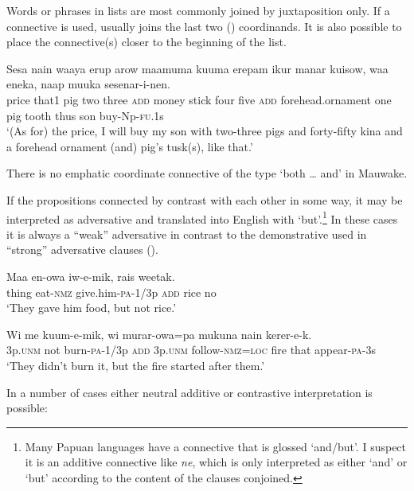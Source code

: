 Words or phrases in lists are most commonly joined by juxtaposition only. If a connective is used,  usually joins the last two () coordinands. It is also possible to place the connective(s) closer to the beginning of the list.

\ea%
\label{ex:x1359}
\gll Sesa nain waaya erup arow  maamuma kuuma erepam ikur  manar kuisow, waa eneka, naap muuka sesenar-i-nen.\\
price that1 pig two three \textsc{add} money stick four five \textsc{add} forehead.ornament one pig tooth thus son buy-Np-\textsc{fu}.1s\\
\glt`(As for) the price, I will buy my son with two-three pigs and forty-fifty kina and a forehead ornament (and) pig's tusk(s), like that.'
\z

There is no emphatic coordinate connective of the type `both {\dots} and' in Mauwake. 

If the propositions connected by  contrast with each other in some way, it may be interpreted as adversative and translated into English with `but'.\footnote{Many Papuan languages have a connective that is glossed `and/but'. I suspect it is an additive connective like \textit{ne}, which is only interpreted as either `and' or `but' according to the content of the clauses conjoined.} In these cases it is always a ``weak'' adversative in contrast to the demonstrative  used in ``strong'' adversative clauses ().

\ea%
\label{ex:x715}
\gll Maa en-owa iw-e-mik,  rais weetak. \\
thing eat-\textsc{nmz} give.him-\textsc{pa}-1/3p \textsc{add} rice no\\
\glt`They gave him food, but not rice.'
\z

\ea%
\label{ex:x716}
\gll Wi me kuum-e-mik,  wi murar-owa=pa mukuna nain kerer-e-k. \\
3p.\textsc{unm} not burn-\textsc{pa}-1/3p \textsc{add} 3p.\textsc{unm} follow-\textsc{nmz}=\textsc{loc} fire that appear-\textsc{pa}-3s\\
\glt`They didn't burn it, but the fire started after them.'
\z

In a number of cases either neutral additive or contrastive interpretation is possible:

